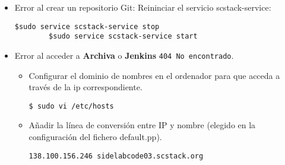 \begin{itemize}
    \item Error al crear un repositorio Git: Reininciar el servicio scstack-service:
    \lstset{style=rubybasico}
    \begin{lstlisting}[frame=trbl]
        $sudo service scstack-service stop
        $sudo service scstack-service start
    \end{lstlisting}

    \item Error al acceder a \textbf{Archiva} o \textbf{Jenkins} \texttt{404 No encontrado}.
    \begin{itemize}
        \item Configurar el dominio de nombres en el ordenador para que acceda a través de la ip correspondiente.

        \lstset{style=rubybasico}
        \begin{lstlisting}[frame=trbl]
            $ sudo vi /etc/hosts
        \end{lstlisting}

        \item Añadir la línea de conversión entre IP y nombre (elegido en la configuración del fichero default.pp).

        \lstset{style=rubybasico}
        \begin{lstlisting}[frame=trbl]
            138.100.156.246 sidelabcode03.scstack.org
        \end{lstlisting}
     \end{itemize}
\end{itemize}
